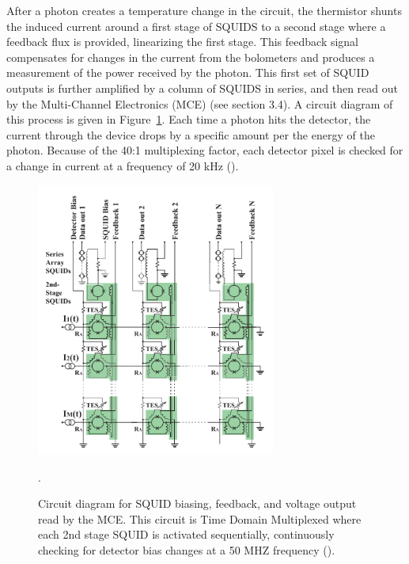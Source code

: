 \documentclass[manuscript]{aastex}
\begin{document}
After a photon creates a temperature change in the circuit, the thermistor shunts the induced current around a first stage of SQUIDS to a second stage where a feedback flux is provided, linearizing the first stage. This feedback signal compensates for changes in the current from the bolometers and produces a measurement of the power received by the photon. This first set of SQUID outputs is further amplified by a column of SQUIDS in series, and then read out by the Multi-Channel Electronics (MCE) (see section 3.4). A circuit diagram of this process is given in Figure~\ref{fig:squids}. Each time a photon hits the detector, the current through the device drops by a specific amount per the energy of the photon. Because of the 40:1 multiplexing factor, each detector pixel is checked for a change in current at a frequency of 20 kHz (\cite{Dobbs2009}).

\begin{figure}[H]
\centering
\captionsetup{width=0.7\textwidth}
\includegraphics[width=0.7\textwidth]{squids.PNG}
\caption[Circuit Diagram for TDM SQUIDS -(\cite{Dobbs2009})]{Circuit diagram for SQUID biasing, feedback, and voltage output read by the MCE. This circuit is Time Domain Multiplexed where each 2nd stage SQUID is activated sequentially, continuously checking for detector bias changes at a 50 MHZ frequency (\cite{Dobbs2009}).}. 
\label{fig:squids}
\vspace{-0.8cm}
\end{figure}

\end{document}
